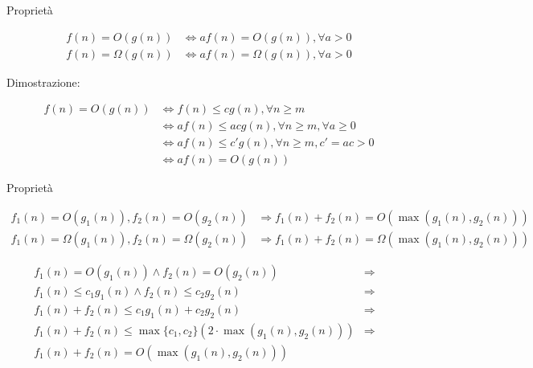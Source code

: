 \begin{frame}{Proprietà}

\begin{myboxtitle}
\begin{align*}
  f(n) = O(g(n)) &\Leftrightarrow af(n) = O(g(n)), \forall a>0 \\
  f(n) = \Omega(g(n)) &\Leftrightarrow af(n) = \Omega(g(n)), \forall a>0 
\end{align*}
\end{myboxtitle}

Dimostrazione:

\begin{align*}
  f(n) = O(g(n)) &\Leftrightarrow f(n) \leq cg(n), \forall n \geq m \\
                 &\Leftrightarrow af(n) \leq acg(n), \forall n \geq m, \forall a \geq 0 \\
                 &\Leftrightarrow af(n) \leq c'g(n), \forall n \geq m, c' = ac > 0 \\
                 &\Leftrightarrow af(n) = O(g(n))
\end{align*}

\end{frame}

\begin{frame}{Proprietà}

\begin{myboxtitle}
\small
\begin{align*}
  f_1(n) = O(g_1(n)), f_2(n) = O(g_2(n)) &\Rightarrow f_1(n)+f_2(n) = O(\max(g_1(n), g_2(n))) \\
  f_1(n) = \Omega(g_1(n)), f_2(n) = \Omega(g_2(n)) &\Rightarrow f_1(n)+f_2(n) = \Omega(\max(g_1(n), g_2(n))) 
\end{align*}
\end{myboxtitle}

\begin{myboxtitle}
\begin{eqnarray*}
  f_1(n) = O(g_1(n)) \wedge f_2(n) = O(g_2(n)) &\Rightarrow& \\
    f_1(n) \leq c_1g_1(n) \wedge f_2(n) \leq c_2g_2(n) &\Rightarrow& \\
    f_1(n)+f_2(n) \leq c_1g_1(n) + c_2g_2(n) &\Rightarrow& \\
    f_1(n)+f_2(n) \leq \max\{c_1,c_2\} (2 \cdot \max(g_1(n),g_2(n))) &\Rightarrow& \\
    f_1(n)+f_2(n) = O(\max(g_1(n), g_2(n)))
\end{eqnarray*}
\end{myboxtitle}

\end{frame}

